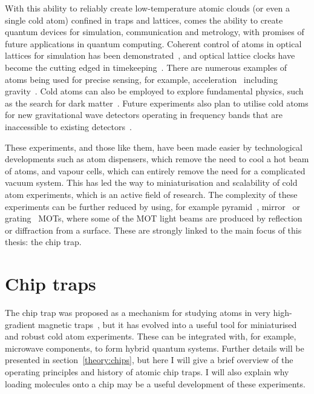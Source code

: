 With this ability to reliably create low-temperature atomic clouds (or even a
single cold atom) confined in traps and lattices, comes the ability to create
quantum devices for simulation, communication and metrology, with promises of
future applications in quantum computing. Coherent control of atoms in optical
lattices for simulation has been demonstrated~\cite{Schafer2020}, and optical
lattice clocks have become the cutting edged in
timekeeping~\cite{PhysRevX.8.021036}. There are numerous examples of atoms
being used for precise sensing, for example, acceleration~\cite{Chen2019}
including gravity~\cite{Stray2022}. Cold atoms can also be employed to
explore fundamental physics, such as the search for dark
matter~\cite{Wcislo2018}. Future experiments also plan to utilise cold atoms
for new gravitational wave detectors operating in frequency bands that are
inaccessible to existing detectors~\cite{Badurina_2020}.

These experiments, and those like them, have been made easier by technological
developments such as atom dispensers, which remove the need to cool
a hot beam of atoms, and vapour cells, which can entirely remove the
need for a complicated vacuum system. This has led the way to miniaturisation
and scalability of cold atom experiments, which is an active field of research.
The complexity of these experiments can be further reduced by using, for
example pyramid~\cite{Lee:96}, mirror~\cite{Reichel1999, 4797887} or
grating~\cite{Nshii2013} MOTs, where some of the MOT light beams are produced
by reflection or diffraction from a surface. These are strongly linked to the
main focus of this thesis: the chip trap.

\section{Chip traps}

The chip trap was proposed as a mechanism for studying atoms in very
high-gradient magnetic traps~\cite{PhysRevA.52.4004}, but it has evolved into a
useful tool for miniaturised and robust cold atom experiments. These can be
integrated with, for example, microwave components, to form hybrid quantum
systems. Further details will be presented in section~\ref{theory:chips}, but
here I will give a brief overview of the operating principles and history of
atomic chip traps. I will also explain why loading molecules onto a chip may be
a useful development of these experiments.

